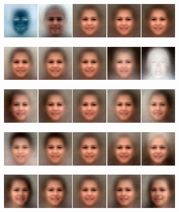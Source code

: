 \begin{figure} [h!]
    \centering
    \begin{subfigure}[b]{\textwidth}
        \includegraphics[width=\textwidth]{fig/PCA/pca0}
   
    \end{subfigure}
    \begin{subfigure}[b]{\textwidth}
        \includegraphics[width=\textwidth]{fig/PCA/pca1}
       
    \end{subfigure}
    \begin{subfigure}[b]{\textwidth}
        \includegraphics[width=\textwidth]{fig/PCA/pca2}
       
    \end{subfigure}
    \begin{subfigure}[b]{\textwidth}
        \includegraphics[width=\textwidth]{fig/PCA/pca3}
       
    \end{subfigure}
    \begin{subfigure}[b]{\textwidth}
        \includegraphics[width=\textwidth]{fig/PCA/pca4}


\end{subfigure}
\end{figure}
